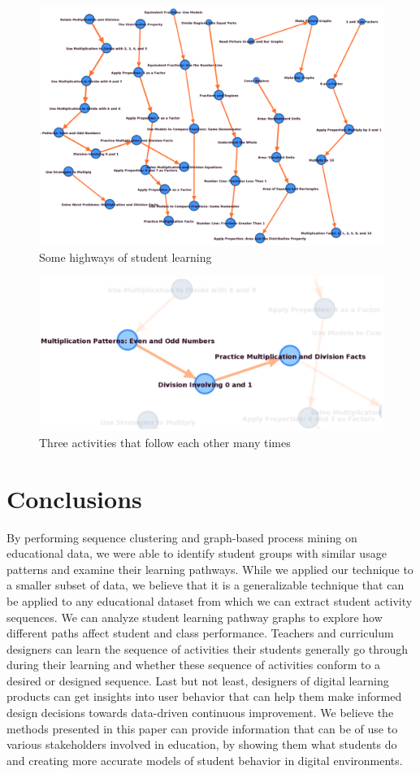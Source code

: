 \documentclass{edm_template}
\begin{document}
\begin{figure}
\centering
\includegraphics[scale=.38]{graph3.ps}
\caption{Some highways of student learning}
\end{figure}

\begin{figure}
\centering
\includegraphics[scale=.45]{graph4.ps}
\caption{Three activities that follow each other many times}
\end{figure}

\section{Conclusions}
By performing sequence clustering and graph-based process mining on educational data, we were able to identify student groups with similar usage patterns and examine their learning pathways. While we applied our technique to a smaller subset of data, we believe that it is a generalizable technique that can be applied to any educational dataset from which we can extract student activity sequences. We can analyze student learning pathway graphs to explore how different paths affect student and class performance. Teachers and curriculum designers can learn the sequence of activities their students generally go through during their learning and whether these sequence of activities conform to a desired or designed sequence. Last but not least, designers of digital learning products can get insights into user behavior that can help them make informed design decisions towards data-driven continuous improvement. We believe the methods presented in this paper can provide information that can be of use to various stakeholders involved in education, by showing them what students do and creating more accurate models of student behavior in digital environments.
\end{document}

